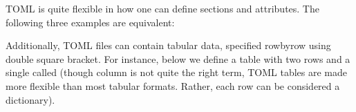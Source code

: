 \documentclass[letterpaper,10pt,english]{sphinxmanual}
\begin{document}
\begin{sphinxVerbatim}[commandchars=\\\{\}]
  

  

  
\end{sphinxVerbatim}

TOML is quite flexible in how one can define sections and attributes. The following
three examples are equivalent:

\begin{sphinxVerbatim}[commandchars=\\\{\}]
  
  
\end{sphinxVerbatim}

\begin{sphinxVerbatim}[commandchars=\\\{\}]
     
\end{sphinxVerbatim}

\begin{sphinxVerbatim}[commandchars=\\\{\}]
  
  
\end{sphinxVerbatim}
\label{\detokenize{inputs/toml_primer:toml-array}}
Additionally, TOML files can contain tabular data, specified row\sphinxhyphen{}by\sphinxhyphen{}row using double
square bracket. For instance, below we define a table with two rows and a single
 called  (though column is not quite the right term, TOML tables are made more
flexible than most tabular formats. Rather, each row can be considered a
dictionary).

\begin{sphinxVerbatim}[commandchars=\\\{\}]
  

  
\end{sphinxVerbatim}
\end{document}
